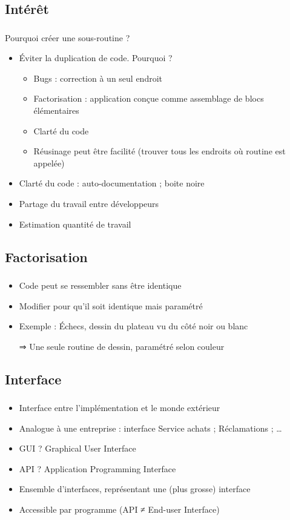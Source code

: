 \documentclass[english, french]{beamer}
\begin{document}
\subsection{Intérêt}
\begin{frame}
	\frametitle{\subsecname}
	Pourquoi créer une sous-routine ?
	\begin{itemize}
		\item Éviter la duplication de code. Pourquoi ? \pause
		\begin{itemize}
			\item Bugs : correction à un seul endroit
			\item Factorisation : application conçue comme assemblage de blocs élémentaires
			\item Clarté du code
			\item Réusinage peut être facilité (trouver tous les endroits où routine est appelée)
		\end{itemize}\pause
		\item Clarté du code : auto-documentation ; boite noire
		\item Partage du travail entre développeurs
		\item Estimation quantité de travail
	\end{itemize}
\end{frame}

\subsection{Factorisation}
\begin{frame}
	\frametitle{\subsecname}
	\begin{itemize}
		\item Code peut se ressembler sans être identique
		\item Modifier pour qu’il soit identique mais paramétré
		\item Exemple : Échecs, dessin du plateau vu du côté noir ou blanc
		\item[⇒] Une seule routine de dessin, paramétré selon couleur
	\end{itemize}
\end{frame}

\subsection{Interface}
\begin{frame}
	\frametitle{\subsecname}
	\begin{itemize}
		\item Interface entre l’implémentation et le monde extérieur
		\item Analogue à une entreprise : interface Service achats ; Réclamations ; …
		\item GUI ? \pause Graphical User Interface
		\item API ? \pause Application Programming Interface
		\item Ensemble d’interfaces, représentant une (plus grosse) interface
		\item Accessible par programme (API ≠ End-user Interface)
	\end{itemize}
\end{frame}
\end{document}
